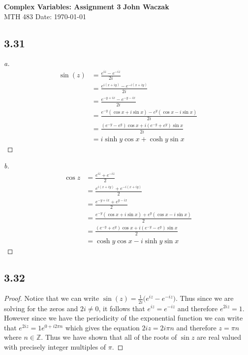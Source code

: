 \documentclass[a4paper, 11pt]{article}
\begin{document}
\noindent
\large\textbf{Complex Variables: Assignment 3} \hfill \textbf{John Waczak} \\
\normalsize MTH 483 \hfill  Date: \today \\


\subsection*{3.31} 
	\begin{proof}[a]
		\begin{align*}
			\sin(z) &= \frac{e^{iz}-e^{-iz}}{2i} \\ 
				&= \frac{e^{i(x+iy)}-e^{-i(x+iy)}}{2i} \\ 
				&= \frac{e^{-y+ix}-e^{-y-ix}}{2i} \\ 
				&= \frac{e^{-y}(\cos x + i \sin x)-e^{y}(\cos x - i \sin x)}{2i} \\ 
				&= \frac{(e^{-y}-e^{y})\cos x + i(e^{-y}+e^{y})\sin x}{2i} \\ 
				&= i\sinh y \cos x + \cosh y \sin x 
		\end{align*}
	\end{proof}
	
	\begin{proof}[b] 
		\begin{align*}
			\cos z &= \frac{e^{iz}+e^{-iz}}{2} \\ 
				&= \frac{e^{i(x+iy)}+e^{-i(x+iy)}}{2} \\ 
				&= \frac{e^{-y+ix}+e^{y-ix}}{2} \\ 
				&= \frac{e^{-y}(\cos x + i \sin x)+e^{y}(\cos x - i \sin x)}{2}\\ 
				&= \frac{(e^{-y}+e^{y})\cos x + i(e^{-y}-e^{y})\sin x}{2} \\ 
				&= \cosh y \cos x - i \sinh y \sin x 
		\end{align*}
	\end{proof}
	
\subsection*{3.32}
	\begin{proof}
		Notice that we can write $\sin(z) = \frac{1}{2i}\Big(e^{iz}-e^{-iz}\Big)$. Thus since we are solving for the zeros and $2i\neq0$, it follows that $e^{iz}=e^{-iz}$ and therefore $e^{2iz} = 1$. However since we have the periodicity of the exponential function we can write that $e^{2iz} = 1e^{0 +i 2\pi n}$ which gives the equation $2iz = 2i\pi n$ and therefore $z= \pi n$ where $n\in\mathbb{Z}$. Thus we have shown that all of the roots of $\sin z$ are real valued with precisely integer multiples of $\pi$. 
	\end{proof}
		
\end{document}
